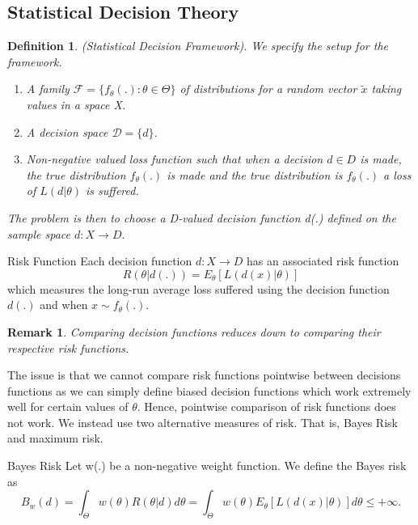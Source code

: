 \documentclass[twoside]{article}
\newtheorem{definition}[theorem]{Definition}
\newtheorem{remark}[theorem]{Remark}
\begin{document}
\subsection{Statistical Decision Theory}

\begin{definition}(Statistical Decision Framework). We specify the setup for the framework. \begin{enumerate}
\item A family $\mathcal{F} = \{f_{\theta}(.): \theta \in \Theta\}$ of distributions for a random vector $\tilde{x}$ taking values in a space X.
\item A decision space $\mathcal{D} = \{d\}$.
\item Non-negative valued loss function such that when a decision $d \in D$ is made, the true distribution $f_{\theta}(.)$ is made and the true distribution is $f_{\theta}(.)$ a loss of $L(d|\theta)$ is suffered.
\end{enumerate}
The problem is then to choose a D-valued decision function d(.) defined on the sample space $d: X \rightarrow D.$
\end{definition}

\begin{definition_exam}{Risk Function}{} Each decision function $d: X \rightarrow D$ has an associated risk function 
$$
R(\theta|d(.)) = E_{\theta}[L(d(x)|\theta)]
$$
which measures the long-run average loss suffered using the decision function $d(.)$ and when $x \sim f_{\theta}(.).$
\end{definition_exam}

\begin{remark}Comparing decision functions reduces down to comparing their respective risk functions.
\end{remark}

The issue is that we cannot compare risk functions pointwise between decisions functions as we can simply define biased decision functions which work extremely well for certain values of $\theta.$ Hence, pointwise comparison of risk functions does not work. We instead use two alternative measures of risk. That is, Bayes Risk and maximum risk.

\begin{definition_exam}{Bayes Risk}{} Let w(.) be a non-negative weight function. We define the Bayes risk as 
$$
B_{w}(d) = \int_{\Theta}w(\theta)R(\theta|d)d\theta = \int_{\Theta}w(\theta)E_{\theta}[L(d(x)|\theta)]d\theta \leq +\infty.
$$
\end{definition_exam}
\end{document}
